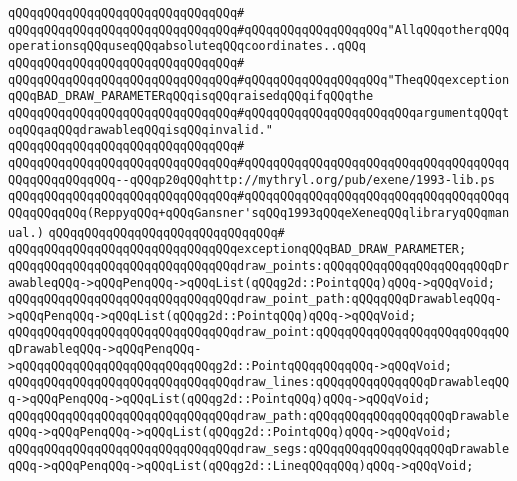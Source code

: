 \verb|qQQqqQQqqQQqqQQqqQQqqQQqqQQqqQQq#|\newline
\verb|qQQqqQQqqQQqqQQqqQQqqQQqqQQqqQQq#qQQqqQQqqQQqqQQqqQQq"AllqQQqotherqQQqoperationsqQQquseqQQqabsoluteqQQqcoordinates..qQQq|\newline
\verb|qQQqqQQqqQQqqQQqqQQqqQQqqQQqqQQq#|\newline
\verb|qQQqqQQqqQQqqQQqqQQqqQQqqQQqqQQq#qQQqqQQqqQQqqQQqqQQq"TheqQQqexceptionqQQqBAD_DRAW_PARAMETERqQQqisqQQqraisedqQQqifqQQqthe|\newline
\verb|qQQqqQQqqQQqqQQqqQQqqQQqqQQqqQQq#qQQqqQQqqQQqqQQqqQQqqQQqargumentqQQqtoqQQqaqQQqdrawableqQQqisqQQqinvalid."|\newline
\verb|qQQqqQQqqQQqqQQqqQQqqQQqqQQqqQQq#|\newline
\verb|qQQqqQQqqQQqqQQqqQQqqQQqqQQqqQQq#qQQqqQQqqQQqqQQqqQQqqQQqqQQqqQQqqQQqqQQqqQQqqQQqqQQq--qQQqp20qQQqhttp://mythryl.org/pub/exene/1993-lib.ps|\newline
\verb|qQQqqQQqqQQqqQQqqQQqqQQqqQQqqQQq#qQQqqQQqqQQqqQQqqQQqqQQqqQQqqQQqqQQqqQQqqQQqqQQq(ReppyqQQq+qQQqGansner'sqQQq1993qQQqeXeneqQQqlibraryqQQqmanual.)|\newline
\verb|qQQqqQQqqQQqqQQqqQQqqQQqqQQqqQQq#|\newline
\verb|qQQqqQQqqQQqqQQqqQQqqQQqqQQqqQQqexceptionqQQqBAD_DRAW_PARAMETER;|\newline
\newline
\verb|qQQqqQQqqQQqqQQqqQQqqQQqqQQqqQQqdraw_points:qQQqqQQqqQQqqQQqqQQqqQQqDrawableqQQq->qQQqPenqQQq->qQQqList(qQQqg2d::PointqQQq)qQQq->qQQqVoid;|\newline
\verb|qQQqqQQqqQQqqQQqqQQqqQQqqQQqqQQqdraw_point_path:qQQqqQQqDrawableqQQq->qQQqPenqQQq->qQQqList(qQQqg2d::PointqQQq)qQQq->qQQqVoid;|\newline
\verb|qQQqqQQqqQQqqQQqqQQqqQQqqQQqqQQqdraw_point:qQQqqQQqqQQqqQQqqQQqqQQqqQQqDrawableqQQq->qQQqPenqQQq->qQQqqQQqqQQqqQQqqQQqqQQqqQQqg2d::PointqQQqqQQqqQQq->qQQqVoid;|\newline
\newline
\verb|qQQqqQQqqQQqqQQqqQQqqQQqqQQqqQQqdraw_lines:qQQqqQQqqQQqqQQqDrawableqQQq->qQQqPenqQQq->qQQqList(qQQqg2d::PointqQQq)qQQq->qQQqVoid;|\newline
\verb|qQQqqQQqqQQqqQQqqQQqqQQqqQQqqQQqdraw_path:qQQqqQQqqQQqqQQqqQQqDrawableqQQq->qQQqPenqQQq->qQQqList(qQQqg2d::PointqQQq)qQQq->qQQqVoid;|\newline
\verb|qQQqqQQqqQQqqQQqqQQqqQQqqQQqqQQqdraw_segs:qQQqqQQqqQQqqQQqqQQqDrawableqQQq->qQQqPenqQQq->qQQqList(qQQqg2d::LineqQQqqQQq)qQQq->qQQqVoid;|\newline
